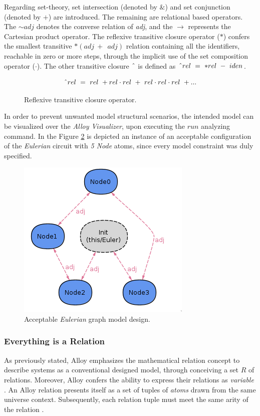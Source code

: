 Regarding set-theory, set intersection (denoted by $\&$) and set conjunction (denoted by $+$) are introduced. The remaining are relational based operators. The $\sim adj$ denotes the converse relation of \textit{adj}, and the $\rightarrow$ represents the Cartesian product operator. The reflexive transitive closure operator ($\ast$) confers the
smallest transitive $\ast(adj\ +\ ~adj)$ relation containing all the identifiers, reachable in zero or more steps, through the implicit use of the set composition operator ($\cdot$). The other transitive closure $\string^$ is defined as $\string^ rel\ =\ \ast rel\ -\ iden$.

\begin{figure}[H]
    \[\string^ rel\ =\ rel\ + rel \cdot rel\ +\ rel \cdot rel \cdot rel\ + ... \]  
\caption{Reflexive transitive closure operator.}
\label{math:alloy-transitive}
\end{figure}

In order to prevent unwanted model structural scenarios, the intended model can be visualized over the \textit{Alloy Visualizer}, upon executing the $run$ analyzing command. In the Figure \ref{fig:alloy-eulerian_1} is depicted an instance of an acceptable configuration of the \textit{Eulerian} circuit with \textit{5 Node} atoms, since every model constraint was duly specified.

\begin{figure}[H]
    \centering
    \includegraphics[width=0.4\linewidth]{images/alloy_eulerian_1.png}
    \caption{Acceptable \textit{Eulerian} graph model design.}
    \label{fig:alloy-eulerian_1}
\end{figure}


\subsubsection{Everything is a Relation}

As previously stated, Alloy emphasizes the mathematical relation concept to describe systems as a conventional designed model, through conceiving a set $R$ of relations. Moreover, Alloy confers the ability to express their relations as \textit{variable} \cite{lwspecification}. An Alloy relation presents itself as a set of tuples of \textit{atoms} drawn from the same universe context. Subsequently, each relation tuple must meet the same arity of the relation \cite{alloy-docs}.


